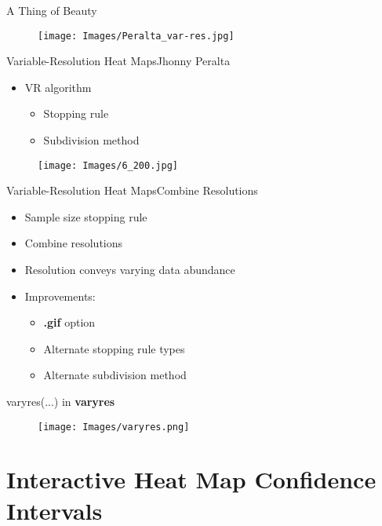 \documentclass{beamer}
\begin{document}
\begin{frame}{A Thing of Beauty}{}
  \begin{figure}[H]
	\centering
	\texttt{[image: Images/Peralta\_var-res.jpg]}
	\label{fig:interp}
  \end{figure}
\end{frame}

\begin{frame}{Variable-Resolution Heat Maps}{Jhonny Peralta}
\begin{itemize}
\item VR algorithm
    \begin{itemize}
    \item Stopping rule
    \item Subdivision method
    \end{itemize}
\end{itemize}
  \begin{figure}[H]
	\centering
	\texttt{[image: Images/6\_200.jpg]}
	\end{figure}
\end{frame}

\begin{frame}{Variable-Resolution Heat Maps}{Combine Resolutions}
\begin{itemize}
\addtolength{\itemsep}{0.5\baselineskip}
\item Sample size stopping rule
\item Combine resolutions
\item Resolution conveys varying data abundance
\item Improvements:
  \begin{itemize}
  \addtolength{\itemsep}{0.5\baselineskip}
  \item {\bf .gif} option
  \item Alternate stopping rule types
  \item Alternate subdivision method
  \end{itemize}
\end{itemize}
\end{frame}

\begin{frame}{varyres(...) in {\bf varyres}}
  \begin{figure}[H]
	\centering
	\texttt{[image: Images/varyres.png]}
	\end{figure}
	\end{frame}

\section{Interactive Heat Map Confidence Intervals}
\end{document}

